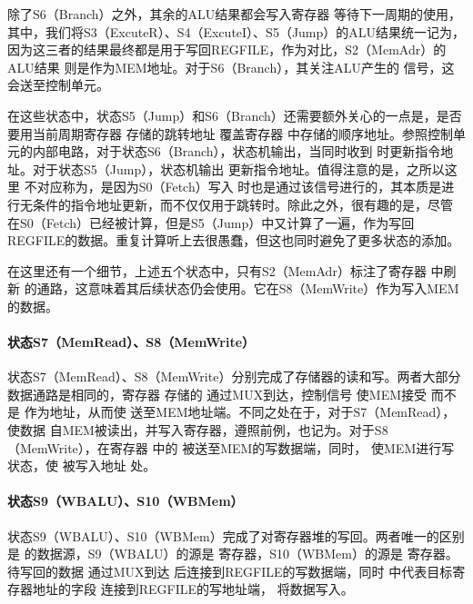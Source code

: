 除了S6（Branch）之外，其余的ALU结果都会写入寄存器 等待下一周期的使用，其中，我们将S3（ExcuteR）、S4（ExcuteI）、S5（Jump）的ALU结果统一记为，因为这三者的结果最终都是用于写回REGFILE，作为对比，S2（MemAdr）的ALU结果 则是作为MEM地址。对于S6（Branch），其关注ALU产生的 信号，这会送至控制单元。

在这些状态中，状态S5（Jump）和S6（Branch）还需要额外关心的一点是，是否要用当前周期寄存器 存储的跳转地址 覆盖寄存器 中存储的顺序地址。参照控制单元的内部电路，对于状态S6（Branch），状态机输出，当同时收到 时更新指令地址。对于状态S5（Jump），状态机输出 更新指令地址。值得注意的是，之所以这里 不对应称为，是因为S0（Fetch）写入 时也是通过该信号进行的，其本质是进行无条件的指令地址更新，而不仅仅用于跳转时。除此之外，很有趣的是，尽管 在S0（Fetch）已经被计算，但是S5（Jump）中又计算了一遍，作为写回REGFILE的数据。重复计算听上去很愚蠢，但这也同时避免了更多状态的添加。

在这里还有一个细节，上述五个状态中，只有S2（MemAdr）标注了寄存器 中刷新 的通路，这意味着其后续状态仍会使用。它在S8（MemWrite）作为写入MEM的数据。

\paragraph{状态S7（MemRead）、S8（MemWrite）}
状态S7（MemRead）、S8（MemWrite）分别完成了存储器的读和写。两者大部分数据通路是相同的，寄存器 存储的 通过MUX到达，控制信号 使MEM接受 而不是 作为地址，从而使 送至MEM地址端。不同之处在于，对于S7（MemRead）， 使数据\codex{[imm(rs1)]} 自MEM被读出，并写入寄存器，遵照前例，也记为。对于S8（MemWrite），在寄存器 中的 被送至MEM的写数据端，同时， 使MEM进行写状态，使 被写入地址 处。

\paragraph{状态S9（WBALU）、S10（WBMem）}
状态S9（WBALU）、S10（WBMem）完成了对寄存器堆的写回。两者唯一的区别是 的数据源，S9（WBALU）的源是 寄存器，S10（WBMem）的源是 寄存器。待写回的数据 通过MUX到达 后连接到REGFILE的写数据端，同时 中代表目标寄存器地址的字段 连接到REGFILE的写地址端， 将数据写入。